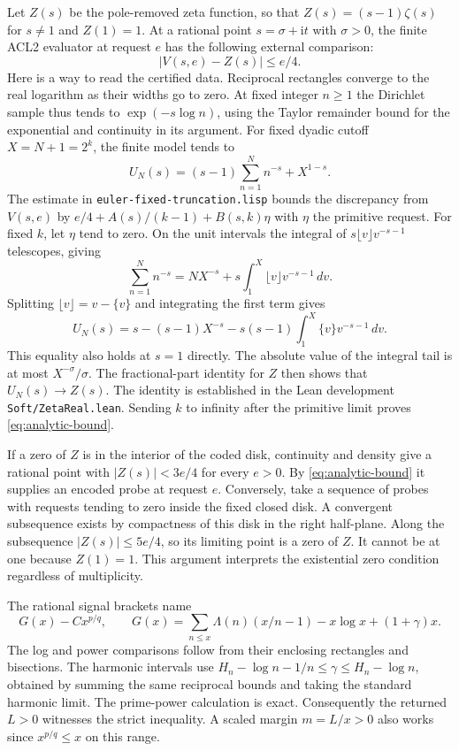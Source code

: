 \documentclass[11pt]{amsart}
\theoremstyle{definition}
\theoremstyle{remark}
\numberwithin{equation}{section}
\newcommand{\code}[1]{\nolinkurl{#1}}
\begin{document}
Let $Z(s)$ be the pole-removed zeta function, so that $Z(s)=(s-1)\zeta(s)$
for $s\ne1$ and $Z(1)=1$. At a rational point $s=\sigma+\mathrm i t$
with $\sigma>0$, the finite ACL2 evaluator at request $e$ has the
following external comparison:
\begin{equation}\label{eq:analytic-bound}
      |V(s,e)-Z(s)|\le e/4.
\end{equation}
Here is a way to read the certified data. Reciprocal rectangles converge
to the real logarithm as their widths go to zero. At fixed integer
$n\ge1$ the Dirichlet sample thus tends to $\exp(-s\log n)$, using the
Taylor remainder bound for the exponential and continuity in its
argument. For fixed dyadic cutoff $X=N+1=2^k$, the finite model tends to
\[
 U_N(s)=(s-1)\sum_{n=1}^N n^{-s}+X^{1-s}.
\]
The estimate in \code{euler-fixed-truncation.lisp} bounds the
discrepancy from $V(s,e)$ by $e/4+A(s)/(k-1)+B(s,k)\eta$ with
$\eta$ the primitive request. For fixed $k$, let $\eta$ tend to
zero. On the unit intervals the integral of
$s\lfloor v\rfloor v^{-s-1}$ telescopes, giving
\[
 \sum_{n=1}^N n^{-s}
  =N X^{-s}+s\int_1^X\lfloor v\rfloor v^{-s-1}\,dv .
\]
Splitting $\lfloor v\rfloor=v-\{v\}$ and integrating the first term
gives
\[
 U_N(s)=s-(s-1)X^{-s}
                -s(s-1)\int_1^X \{v\}v^{-s-1}\,dv .
\]
This equality also holds at $s=1$ directly. The absolute value of
the integral tail is at most $X^{-\sigma}/\sigma$.
The fractional-part identity for $Z$ then shows that $U_N(s)\to Z(s)$.
The identity is established in the Lean development
\code{Soft/ZetaReal.lean}. Sending $k$ to infinity after the
primitive limit proves \eqref{eq:analytic-bound}.

If a zero of $Z$ is in the interior of the coded disk, continuity and
density give a rational point with $|Z(s)|<3e/4$ for every $e>0$.
By \eqref{eq:analytic-bound} it supplies an encoded probe at request
$e$. Conversely, take a sequence of probes with requests tending to
zero inside the fixed closed disk. A convergent subsequence exists
by compactness of this disk in the right half-plane. Along the
subsequence $|Z(s)|\le 5e/4$, so its limiting point is a zero of $Z$.
It cannot be at one because $Z(1)=1$. This argument interprets the
existential zero condition regardless of multiplicity.

The rational signal brackets name
\[
 G(x)-C x^{p/q},\qquad
 G(x)=\sum_{n\le x}\Lambda(n)(x/n-1)-x\log x+(1+\gamma)x.
\]
The log and power comparisons follow from their enclosing
rectangles and bisections. The harmonic intervals use
$H_n-\log n-1/n\le\gamma\le H_n-\log n$, obtained by summing the
same reciprocal bounds and taking the standard harmonic limit.
The prime-power calculation is exact. Consequently the returned
$L>0$ witnesses the strict inequality. A scaled margin
$m=L/x>0$ also works since $x^{p/q}\le x$ on this range.
\end{document}
